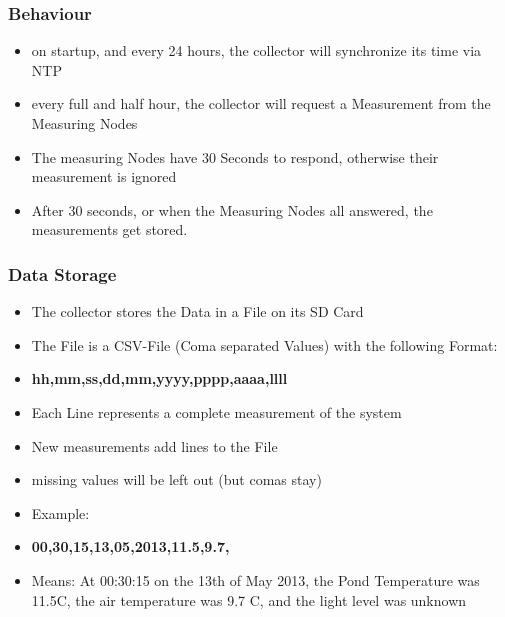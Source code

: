 \documentclass{beamer}
\begin{document}
\frame
{
	\frametitle{Behaviour}

	\begin{itemize}
	
	\item on startup, and every 24 hours, the collector will synchronize its time via NTP
	\item every full and half hour, the collector will request a Measurement from the Measuring Nodes
	\item The measuring Nodes have 30 Seconds to respond, otherwise their measurement is ignored
	\item After 30 seconds, or when the Measuring Nodes all answered, the measurements get stored.
	
	\end{itemize}

}


\frame
{
	\frametitle{Data Storage}

	\begin{itemize}
	
	\item The collector stores the Data in a File on its SD Card
	
	\item The File is a CSV-File (Coma separated Values) with the following Format:
	
	\item \textbf{hh,mm,ss,dd,mm,yyyy,pppp,aaaa,llll}
	
	\item Each Line represents a complete measurement of the system
	\item New measurements add lines to the File
	
	\end{itemize}
}

\frame
{
	\begin{itemize}
	\item missing values will be left out (but comas stay)
	
	\item Example:
	
	\item \textbf{00,30,15,13,05,2013,11.5,9.7,}
	
	\item Means: At 00:30:15 on the 13th of May 2013, the Pond Temperature was 11.5C, the air temperature was 9.7 C, and the light level was unknown
	\end{itemize}
}
\end{document}
